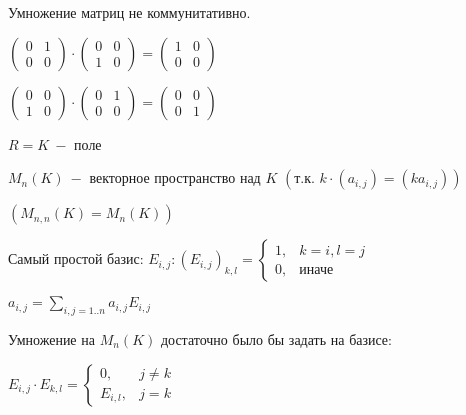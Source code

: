 \begin{remark}
    Умножение матриц не коммунитативно.
    
    $\begin{pmatrix}0 &1 \\ 0&0\end{pmatrix}\cdot \begin{pmatrix}0 &0 \\ 
1&0\end{pmatrix}=\begin{pmatrix}1 &0 \\ 0&0\end{pmatrix}$ 
    
    $\begin{pmatrix}0 &0 \\ 1&0\end{pmatrix}\cdot \begin{pmatrix}0 &1 \\ 
0&0\end{pmatrix}=\begin{pmatrix}0 &0 \\ 0&1\end{pmatrix}$
\end{remark}

\begin{remark}
    $R=K\ -$ поле
    
    $M_n(K)\ -$ векторное пространство над $K$ $(\text{т.к. }k\cdot 
(a_{i,j})=(ka_{i,j}))$

    $(M_{n,n}(K)=M_n(K))$

    Самый простой базис: $E_{i,j}:(E_{i,j})_{k,l}=\begin{cases}1,&k=i,l=j 
\\ 0, &\text{иначе}\end{cases}$

    $a_{i,j}=\sum\limits_{i,j=1..n}a_{i,j}E_{i,j}$
\end{remark}

\begin{remark}
    Умножение на $M_{n}(K)$ достаточно было бы задать на базисе:

    $E_{i,j}\cdot E_{k,l}=\begin{cases} 0,&j\neq k \\ E_{i,l}, 
&j=k\end{cases}$
\end{remark}
